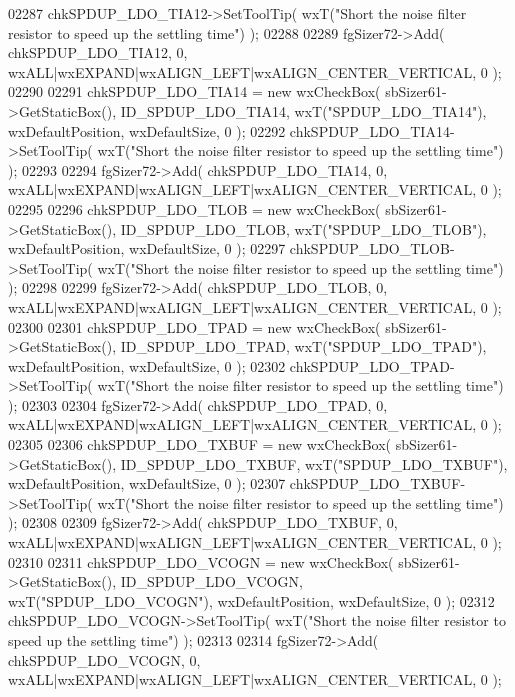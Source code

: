 \begin{DoxyCode}
02287     chkSPDUP_LDO_TIA12->SetToolTip( wxT(\textcolor{stringliteral}{"Short the noise filter resistor to speed up the settling time"}) );
02288     
02289     fgSizer72->Add( chkSPDUP_LDO_TIA12, 0, wxALL|wxEXPAND|wxALIGN\_LEFT|wxALIGN\_CENTER\_VERTICAL, 0 );
02290     
02291     chkSPDUP_LDO_TIA14 = \textcolor{keyword}{new} wxCheckBox( sbSizer61->GetStaticBox(), 
      ID_SPDUP_LDO_TIA14, wxT(\textcolor{stringliteral}{"SPDUP\_LDO\_TIA14"}), wxDefaultPosition, wxDefaultSize, 0 );
02292     chkSPDUP_LDO_TIA14->SetToolTip( wxT(\textcolor{stringliteral}{"Short the noise filter resistor to speed up the settling time"}) );
02293     
02294     fgSizer72->Add( chkSPDUP_LDO_TIA14, 0, wxALL|wxEXPAND|wxALIGN\_LEFT|wxALIGN\_CENTER\_VERTICAL, 0 );
02295     
02296     chkSPDUP_LDO_TLOB = \textcolor{keyword}{new} wxCheckBox( sbSizer61->GetStaticBox(), 
      ID_SPDUP_LDO_TLOB, wxT(\textcolor{stringliteral}{"SPDUP\_LDO\_TLOB"}), wxDefaultPosition, wxDefaultSize, 0 );
02297     chkSPDUP_LDO_TLOB->SetToolTip( wxT(\textcolor{stringliteral}{"Short the noise filter resistor to speed up the settling time"}) );
02298     
02299     fgSizer72->Add( chkSPDUP_LDO_TLOB, 0, wxALL|wxEXPAND|wxALIGN\_LEFT|wxALIGN\_CENTER\_VERTICAL, 0 );
02300     
02301     chkSPDUP_LDO_TPAD = \textcolor{keyword}{new} wxCheckBox( sbSizer61->GetStaticBox(), 
      ID_SPDUP_LDO_TPAD, wxT(\textcolor{stringliteral}{"SPDUP\_LDO\_TPAD"}), wxDefaultPosition, wxDefaultSize, 0 );
02302     chkSPDUP_LDO_TPAD->SetToolTip( wxT(\textcolor{stringliteral}{"Short the noise filter resistor to speed up the settling time"}) );
02303     
02304     fgSizer72->Add( chkSPDUP_LDO_TPAD, 0, wxALL|wxEXPAND|wxALIGN\_LEFT|wxALIGN\_CENTER\_VERTICAL, 0 );
02305     
02306     chkSPDUP_LDO_TXBUF = \textcolor{keyword}{new} wxCheckBox( sbSizer61->GetStaticBox(), 
      ID_SPDUP_LDO_TXBUF, wxT(\textcolor{stringliteral}{"SPDUP\_LDO\_TXBUF"}), wxDefaultPosition, wxDefaultSize, 0 );
02307     chkSPDUP_LDO_TXBUF->SetToolTip( wxT(\textcolor{stringliteral}{"Short the noise filter resistor to speed up the settling time"}) );
02308     
02309     fgSizer72->Add( chkSPDUP_LDO_TXBUF, 0, wxALL|wxEXPAND|wxALIGN\_LEFT|wxALIGN\_CENTER\_VERTICAL, 0 );
02310     
02311     chkSPDUP_LDO_VCOGN = \textcolor{keyword}{new} wxCheckBox( sbSizer61->GetStaticBox(), 
      ID_SPDUP_LDO_VCOGN, wxT(\textcolor{stringliteral}{"SPDUP\_LDO\_VCOGN"}), wxDefaultPosition, wxDefaultSize, 0 );
02312     chkSPDUP_LDO_VCOGN->SetToolTip( wxT(\textcolor{stringliteral}{"Short the noise filter resistor to speed up the settling time"}) );
02313     
02314     fgSizer72->Add( chkSPDUP_LDO_VCOGN, 0, wxALL|wxEXPAND|wxALIGN\_LEFT|wxALIGN\_CENTER\_VERTICAL, 0 );

\end{DoxyCode}
